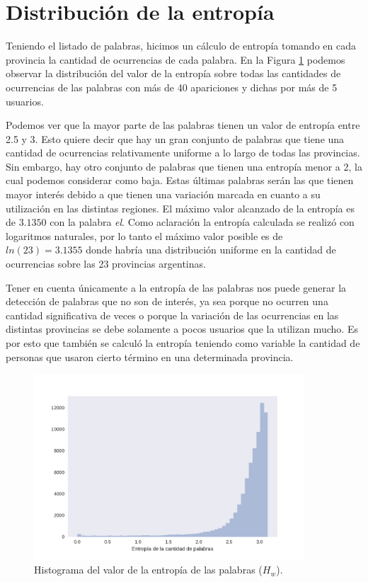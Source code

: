 \section{Distribución de la entropía}
Teniendo el listado de palabras, hicimos un cálculo de entropía tomando en cada provincia la cantidad de ocurrencias de cada palabra. En la Figura \ref{fig:entropiaPalabras} podemos observar la distribución del valor de la entropía sobre todas las cantidades de ocurrencias de las palabras con más de 40 apariciones y dichas por más de 5 usuarios. 

Podemos ver que la mayor parte de las palabras tienen un valor de entropía entre 2.5 y 3. Esto quiere decir que hay un gran conjunto de palabras que tiene una cantidad de ocurrencias relativamente uniforme a lo largo de todas las provincias. Sin embargo, hay otro conjunto de palabras que tienen una entropía menor a 2, la cual podemos considerar como baja. Estas últimas palabras serán las que tienen mayor interés debido a que tienen una variación marcada en cuanto a su utilización en las distintas regiones. El máximo valor alcanzado de la entropía es de $3.1350$ con la palabra \textit{el}. Como aclaración la entropía calculada se realizó con logaritmos naturales, por lo tanto el máximo valor posible es de  $ln(23) = 3.1355$ donde habría una distribución uniforme en la cantidad de ocurrencias sobre las 23 provincias argentinas.

Tener en cuenta únicamente a la entropía de las palabras nos puede generar la detección de palabras que no son de interés, ya sea porque no ocurren una cantidad significativa de veces o porque la variación de las ocurrencias en las distintas provincias se debe solamente a pocos usuarios que la utilizan mucho. Es por esto que también se calculó la entropía teniendo como variable la cantidad de personas que usaron cierto término en una determinada provincia.


\begin{figure}[ht]
\centering
\includegraphics[width=0.9\textwidth]{./images/DistribucionEntropia.pdf}
\caption{Histograma del valor de la entropía de las palabras ($H_w$).} 
\label{fig:entropiaPalabras} 
\end{figure}

